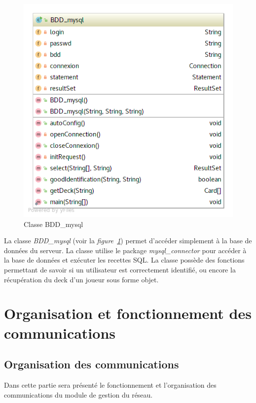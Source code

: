 \documentclass[a4paper,11pt]{report}
\begin{document}
  \begin{figure}[th]
      \begin{center}
        \includegraphics[scale=0.3]{Assets/UML_BDD.png}
        \caption{Classe BDD\_mysql}
        \label{Classe BDD_mysql}
      \end{center}
    \end{figure}
    
    La classe \textit{BDD\_mysql} (voir la \textit{figure~\ref{Classe BDD_mysql}}) permet d’accéder simplement à la base de données du serveur. La classe utilise le package \textit{mysql\_connector} pour accéder à la base de données et exécuter les recettes SQL. La classe possède des fonctions permettant de savoir si un utilisateur est correctement identifié, ou encore la récupération du deck d’un joueur sous forme objet.




\section{Organisation et fonctionnement des communications}

\subsection{Organisation des communications}
Dans cette partie sera présenté le fonctionnement et l’organisation des communications du module de gestion du réseau.
\end{document}
